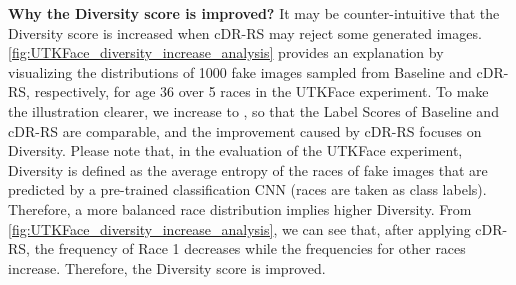 \documentclass[final,12pt, 3p,times]{elsarticle}
\begin{document}
{\setlength{\parindent}{0cm}\textbf{Why the Diversity score is improved?}} 
It may be counter-intuitive that the Diversity score is increased when cDR-RS may reject some generated images. \cref{fig:UTKFace_diversity_increase_analysis} provides an explanation by visualizing the distributions of 1000 fake images sampled from Baseline and cDR-RS, respectively, for age 36 over 5 races in the UTKFace experiment. To make the illustration clearer, we increase  to , so that the Label Scores of Baseline and cDR-RS are comparable, and the improvement caused by cDR-RS focuses on Diversity. Please note that, in the evaluation of the UTKFace experiment, Diversity is defined as the average entropy of the races of fake images that are predicted by a pre-trained classification CNN (races are taken as class labels). Therefore, a more balanced race distribution implies higher Diversity. From \cref{fig:UTKFace_diversity_increase_analysis}, we can see that, after applying cDR-RS, the frequency of Race 1 decreases while the frequencies for other races increase. Therefore, the Diversity score is improved. 
\end{document}
